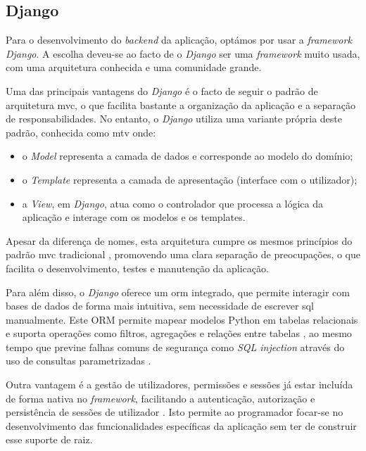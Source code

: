 \subsection{Django}

Para o desenvolvimento do \textit{backend} da aplicação, optámos por usar a \textit{framework} \textit{Django}. A escolha deveu-se ao facto de o \textit{Django} ser uma \textit{framework} muito usada, com uma arquitetura conhecida e uma comunidade grande.

Uma das principais vantagens do \textit{Django} é o facto de seguir o padrão de arquitetura \gls{mvc}, o que facilita bastante a organização da aplicação e a separação de responsabilidades. No entanto, o \textit{Django} utiliza uma variante própria deste padrão, conhecida como \gls{mtv} onde:

\begin{itemize}
    \item o \textit{Model} representa a camada de dados e corresponde ao modelo do domínio;

    \item o \textit{Template} representa a camada de apresentação (interface com o utilizador);

    \item a \textit{View}, em \textit{Django}, atua como o controlador que processa a lógica da aplicação e interage com os modelos e os templates.
\end{itemize}

Apesar da diferença de nomes, esta arquitetura cumpre os mesmos princípios do padrão \gls{mvc} tradicional \cite{fitzgerald2007web,djangodocs}, promovendo uma clara separação de preocupações, o que facilita o desenvolvimento, testes e manutenção da aplicação.

Para além disso, o \textit{Django} oferece um \gls{orm} integrado, que permite interagir com bases de dados de forma mais intuitiva, sem necessidade de escrever \gls{sql} manualmente. Este ORM permite mapear modelos Python em tabelas relacionais e suporta operações como filtros, agregações e relações entre tabelas \cite{djangodocs}, ao mesmo tempo que previne falhas comuns de segurança como \textit{SQL injection} através do uso de consultas parametrizadas \cite{kumar2016security}.

Outra vantagem é a gestão de utilizadores, permissões e sessões já estar incluída de forma nativa no \textit{framework}, facilitando a autenticação, autorização e persistência de sessões de utilizador \cite{djangodocs}. Isto permite ao programador focar-se no desenvolvimento das funcionalidades específicas da aplicação sem ter de construir esse suporte de raiz.

